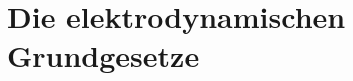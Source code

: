 \documentclass[10pt,twoside,a4paper,fleqn]{article}
\begin{document}
\section{Die elektrodynamischen Grundgesetze}

\end{document}
